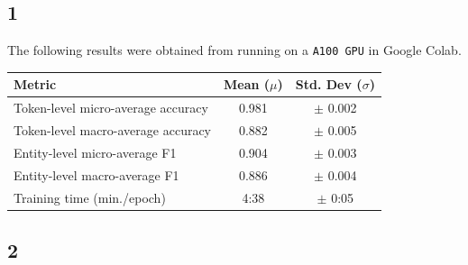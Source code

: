 \documentclass[12pt,a4paper]{report}%
\newcommand\blankpage{%
    \null
    \thispagestyle{empty}%
    \addtocounter{page}{-1}%
    \newpage}
\begin{document}



\subsection*{1}


The following results were obtained from running on a \lstinline{A100 GPU} in Google Colab.

\begin{table}[h]
\centering
\begin{tabular}{|p{6cm}|c|c|}
\hline
\textbf{Metric} & \textbf{Mean ($\mu$)} & \textbf{Std. Dev ($\sigma$)} \\ \hline
Token-level micro-average accuracy & 0.981 & $\pm$ 0.002 \\ \hline
Token-level macro-average accuracy & 0.882 & $\pm$ 0.005 \\ \hline
Entity-level micro-average F1      & 0.904 & $\pm$ 0.003 \\ \hline
Entity-level macro-average F1      & 0.886 & $\pm$ 0.004 \\ \hline
Training time (min./epoch)         & 4:38 & $\pm$ 0:05  \\ \hline
\end{tabular}
\end{table}



\subsection*{2}
\end{document}
